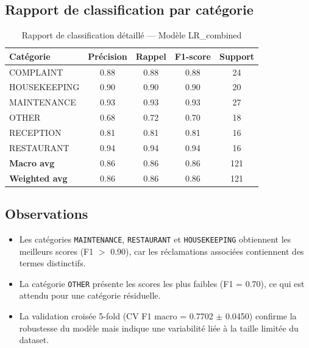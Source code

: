 \subsection{Rapport de classification par catégorie}

\begin{table}[H]
\centering
\caption{Rapport de classification détaillé --- Modèle LR\_combined}
\small
\begin{tabular}{|l|c|c|c|c|}
\hline
\textbf{Catégorie} & \textbf{Précision} & \textbf{Rappel} & \textbf{F1-score} & \textbf{Support} \\ \hline
COMPLAINT & 0.88 & 0.88 & 0.88 & 24 \\ \hline
HOUSEKEEPING & 0.90 & 0.90 & 0.90 & 20 \\ \hline
MAINTENANCE & 0.93 & 0.93 & 0.93 & 27 \\ \hline
OTHER & 0.68 & 0.72 & 0.70 & 18 \\ \hline
RECEPTION & 0.81 & 0.81 & 0.81 & 16 \\ \hline
RESTAURANT & 0.94 & 0.94 & 0.94 & 16 \\ \hline
\hline
\textbf{Macro avg} & 0.86 & 0.86 & 0.86 & 121 \\ \hline
\textbf{Weighted avg} & 0.86 & 0.86 & 0.86 & 121 \\ \hline
\end{tabular}
\label{tab:classification_detail}
\end{table}

\subsection{Observations}
\begin{itemize}
    \item Les catégories \texttt{MAINTENANCE}, \texttt{RESTAURANT} et \texttt{HOUSEKEEPING} obtiennent les meilleurs scores (F1 $>$ 0.90), car les réclamations associées contiennent des termes distinctifs.
    \item La catégorie \texttt{OTHER} présente les scores les plus faibles (F1 = 0.70), ce qui est attendu pour une catégorie résiduelle.
    \item La validation croisée 5-fold (CV F1 macro = 0.7702 $\pm$ 0.0450) confirme la robustesse du modèle mais indique une variabilité liée à la taille limitée du dataset.
\end{itemize}


